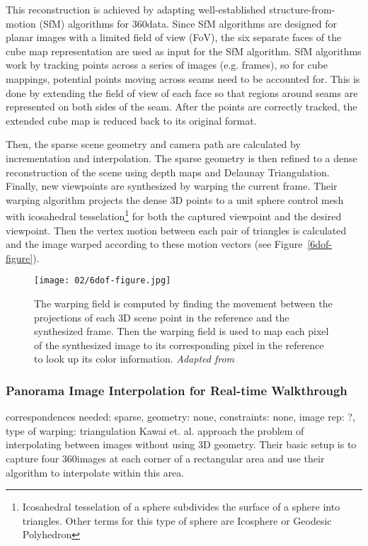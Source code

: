 This reconstruction is achieved by adapting well-established structure-from-motion (SfM) algorithms for 360\degree data. Since SfM algorithms are designed for planar images with a limited field of view (FoV), the six separate faces of the cube map representation are used as input for the SfM algorithm. SfM algorithms work by tracking points across a series of images (e.g. frames), so for cube mappings, potential points moving across seams need to be accounted for. This is done by extending the field of view of each face so that regions around seams are represented on both sides of the seam. After the points are correctly tracked, the extended cube map is reduced back to its original format.

Then, the sparse scene geometry and camera path are calculated by incrementation and interpolation. The sparse geometry is then refined to a dense reconstruction of the scene using depth maps and Delaunay Triangulation. Finally, new viewpoints are synthesized by warping the current frame. Their warping algorithm projects the dense 3D points to a unit sphere control mesh with icosahedral tesselation\footnote{Icosahedral tesselation of a sphere subdivides the surface of a sphere into triangles. Other terms for this type of sphere are Icosphere or Geodesic Polyhedron} for both the captured viewpoint and the desired viewpoint. Then the vertex motion between each pair of triangles is calculated and the image warped according to these motion vectors (see Figure~\ref{6dof-figure}). 

\begin{figure}[]
\centering
\texttt{[image: 02/6dof-figure.jpg]}
\caption[Image warping from Huang et. al.]{The warping field is computed by finding the movement between the projections of each 3D scene point in the reference and the synthesized frame. Then the warping field is used to map each pixel of the synthesized image to its corresponding pixel in the reference to look up its color information. \emph{Adapted from \cite{6dof}}}
\label{fig:6dof-figure}
\end{figure}

\subsubsection{Panorama Image Interpolation for Real-time Walkthrough}
correspondences needed: sparse, geometry: none, constraints: none, image rep: ?, type of warping: triangulation
Kawai et. al. \cite{walkthrough} approach the problem of interpolating between images without using 3D geometry. Their basic setup is to capture four 360\degree images at each corner of a rectangular area and use their algorithm to interpolate within this area.

